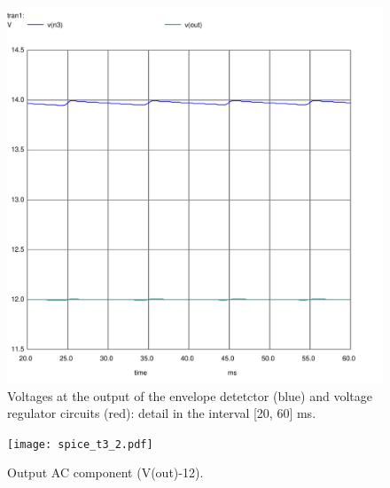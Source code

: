 \begin{figure}[h] \centering
  \includegraphics[scale=0.5]{Spice_t3_Zoom.pdf}
  \caption{Voltages at the output of the envelope detetctor (blue) and voltage regulator circuits (red): detail in the interval [20, 60] ms.}
  \label{fig:33}
\end{figure}

\begin{figure}[h] \centering
  \texttt{[image: spice\_t3\_2.pdf]}
  \caption{Output AC component (V(out)-12).}
  \label{fig:22}
\end{figure}

\clearpage

